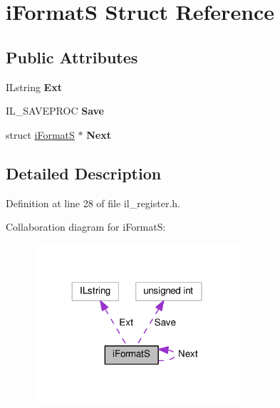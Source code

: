 \hypertarget{structiFormatS}{}\section{i\+FormatS Struct Reference}
\label{structiFormatS}
\subsection*{Public Attributes}
\begin{DoxyCompactItemize}
\item 
\mbox{\label{structiFormatS_abe2d034680c00ecec4bf1bc9b2398a3b}} 
I\+Lstring {\bfseries Ext}
\item 
\mbox{\label{structiFormatS_ac70346735c2cf30fdcda183a93beb90e}} 
I\+L\+\_\+\+S\+A\+V\+E\+P\+R\+OC {\bfseries Save}
\item 
\mbox{\label{structiFormatS_a90ca384875594bd89739cfc1521416b9}} 
struct \hyperlink{structiFormatS}{i\+FormatS} $\ast$ {\bfseries Next}
\end{DoxyCompactItemize}


\subsection{Detailed Description}


Definition at line 28 of file il\+\_\+register.\+h.



Collaboration diagram for i\+FormatS\+:
\nopagebreak
\begin{figure}[H]
\begin{center}
\leavevmode
\includegraphics[width=216pt]{d7/d3f/structiFormatS__coll__graph}
\end{center}
\end{figure}


